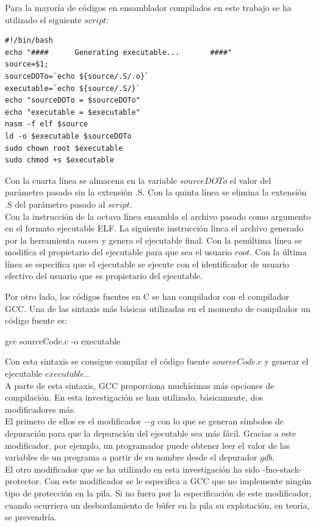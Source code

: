 \documentclass [titlepage, 12pt]{article}
\begin{document}
Para la mayor\'ia de c\'odigos en ensamblador compilados en este trabajo se ha utilizado el siguiente $script$:

\lstset{language=Bash,caption=$Script$ para la generaci\'on de los ejecutables}
\begin{lstlisting}
#!/bin/bash
echo "####      Generating executable...       ####"
source=$1;
sourceDOTo=`echo ${source/.S/.o}`
executable=`echo ${source/.S/}`
echo "sourceDOTo = $sourceDOTo"
echo "executable = $executable"
nasm -f elf $source
ld -o $executable $sourceDOTo
sudo chown root $executable
sudo chmod +s $executable
\end{lstlisting}

Con la cuarta l\'inea se almacena en la variable $sourceDOTo$ el valor del par\'ametro pasado sin la extensi\'on .S. Con la quinta l\'inea se elimina la extensi\'on .S del par\'ametro pasado al $script$.\\
Con la instrucci\'on de la octava l\'inea ensambla el archivo pasado como argumento en el formato ejecutable ELF. La siguiente instrucci\'on linca el archivo generado por la herramienta $nasm$ y genera el ejecutable final. Con la pen\'ultima l\'inea se modifica el propietario del ejecutable para que sea el usuario $root$. 
Con la \'ultima l\'inea se especifica que el ejecutable se ejecute con el identificador de usuario efectivo del usuario que es propietario del ejecutable.

\bigskip

Por otro lado, los c\'odigos fuentes en C se han compilador con el compilador GCC. Una de las sintaxis m\'as b\'asicas utilizadas en el momento de compilador un c\'odigo fuente es:

\begin{listing}[style=consola, numbers=none, caption=Sintaxis b\'asica de GCC]
gcc sourceCode.c -o executable
\end{listing}

Con esta sintaxis se consigue compilar el c\'odigo fuente $sourceCode.c$ y generar el ejecutable $executable.$.\\
A parte de esta sintaxis, GCC proporciona much\'isimas m\'as opciones de compilaci\'on. En esta investigaci\'on se han utilizado, b\'asicamente, dos modificadores m\'as. \\
El primero de ellos es el modificador $-g$ con lo que se generan s\'imbolos de depuraci\'on para que la depuraci\'on del ejecutable sea m\'as f\'acil. Gracias a este modificador, por ejemplo, un programador puede obtener leer el valor de las variables de un programa a partir de su nombre desde el depurador $gdb$.\\
El otro modificador que se ha utilizado en esta investigaci\'on ha sido -fno-stack-protector. Con este modificador se le especifica a GCC que no implemente ning\'un tipo de protecci\'on en la pila. Si no fuera por la especificaci\'on de este modificador, cuando ocurriera un desbordamiento de b\'ufer en la pila su explotaci\'on, en teor\'ia, se prevendr\'ia.
\end{document}
